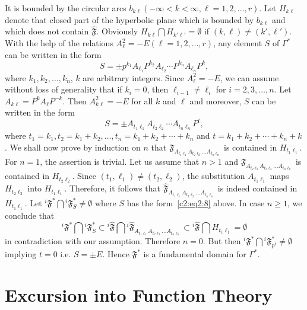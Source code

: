 It is bounded by the circular arcs $b_{k\ell}(-\infty<k<\infty, \ell
=1,2,\ldots, r)$. Let $H_{k\ell}$ denote that closed part of the
hyperbolic plane which is bounded by $b_{k\ell}$ and which does not
contain $\hat{\mathfrak{F}}$. Obviously $H_{k\ell}\bigcap
H_{k'\ell'}=\emptyset$ if $(k,\ell)\neq (k', \ell')$. \pageoriginale
With the help of the relations $A^2_{\ell}=-E(\ell = 1,2, \ldots,
r)$, any element $S$ of $\Gamma^{\ast}$ can be written in the form 
$$
S = \pm p^{k_1} A_{\ell_1} P^{k_2}A_{\ell_2} \cdots P^{k_n}
A_{\ell_n} P^k,
$$
where $k_1, k_2, \ldots, k_n$, $k$ are arbitrary integers. Since
$A^2_{\ell}=-E$, we can assume without loss of generality that if
$k_i=0$, then $\ell_{i-1}\neq \ell_i$ for $i=2,3,\ldots,n$. Let
$A_{k\ell} =P^k A_{\ell}P^{-k}$. Then $A^2_{k\ell}=-E$ for all $k$ and
$\ell$ and moreover, $S$ can be written in the form 
\begin{equation*}
S = \pm A_{t_1\ell_1} A_{t_2\ell_2} 
\cdots A_{t_n\ell_n} P^t, \tag{8}\label{c2:eq2:8}
\end{equation*}
where $t_1=k_1,t_2=k_1+k_2,\ldots, t_n = k_1+k_2+\cdots+k_n$ and
$t=k_1+k_2+\cdots + k_n+k$. We shall now prove by induction on $n$
that $\mathfrak{F}_{A_{t_1\ell_1} A_{t_2\ell_2} \ldots A_{t_n\ell_n}}$
is contained in $H_{t_1\ell_1}$. For $n=1$, the assertion is
trivial. Let us assume that $n>1$ and $\hat{\mathfrak{F}}_{A_{t_2\ell_2}
A_{t_3\ell_3} \ldots A_{t_n\ell_n}}$ is contained in $H_{t_2
\ell_2}$. Since $(t_1, \ell_1) \neq (t_2, \ell_2)$, the substitution
$A_{t_1\ell_1}$ maps $H_{t_2\ell_2}$ into $H_{t_1\ell_1}$. Therefore,
it follows that $\hat{\mathfrak{F}}_{A_{t_1\ell_1} A_{t_2\ell_2} \ldots
A_{t_n\ell_n}}$ is indeed contained in $H_{t_1\ell_1}$. Let
${}^i\mathfrak{F}^{\ast} \bigcap {}^i \mathfrak{F}^{\ast}_S \neq
\emptyset$ where $S$ has the form~\eqref{c2:eq2:8} above. In case $n\geq 1$, we
conclude that 
$$
{}^i \mathfrak{F}^{\ast}\bigcap {}^i \mathfrak{F}^{\ast}_S \subset
{}^i \hat{\mathfrak{F}} \bigcap {}^i\hat{\mathfrak{F}}_{A_{t_1\ell_1} A_{t_2\ell_2} \ldots
  A_{t_n\ell_n}} \subset {}^i \hat{\mathfrak{F}} \bigcap H_{t_1 \ell_1} = \emptyset
$$
in contradiction with our assumption. Therefore $n=0$. But then
${}^i\mathfrak{F}^{\ast}\bigcap{}^i \mathfrak{F}^{\ast}_{p^t} \neq
\emptyset$ implying $t=0$ i.e. $S=\pm E$. Hence $\mathfrak{F}^{\ast}$
is a fundamental domain for $\Gamma^{\ast}$.

\section{Excursion into Function Theory}\label{chap2:sec3}\pageoriginale 

